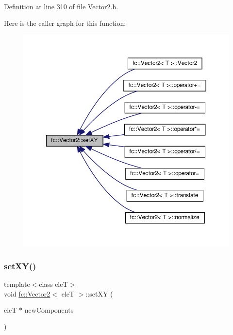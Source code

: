 Definition at line 310 of file Vector2.\+h.

Here is the caller graph for this function\+:
\nopagebreak
\begin{figure}[H]
\begin{center}
\leavevmode
\includegraphics[width=350pt]{d9/d08/classfc_1_1Vector2_a5aec5245348bcf0d5e5dda71b9178001_icgraph}
\end{center}
\end{figure}
\mbox{\label{classfc_1_1Vector2_aa1cd5ea9938c8b31a102f02024163c9d}} 
\subsubsection{\texorpdfstring{set\+X\+Y()}{setXY()}\hspace{0.1cm}{\footnotesize\ttfamily [2/2]}}
{\footnotesize\ttfamily template$<$class eleT$>$ \\
void \hyperlink{classfc_1_1Vector2}{fc\+::\+Vector2}$<$ eleT $>$\+::set\+XY (\begin{DoxyParamCaption}\item[{eleT $\ast$}]{new\+Components }\end{DoxyParamCaption})}




